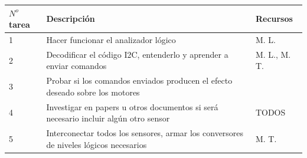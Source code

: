 \documentclass[spanish,12pt,a4paper,titlepage]{report}
\begin{document}
\begin{table}[H]
\begin{tabular}{|p{50pt}|p{250pt}|p{100pt}|} 
\hline
\cellcolor[gray]{0.8} $N^o$ \textbf{tarea} & \cellcolor[gray]{0.8} \textbf{Descripción} & \cellcolor[gray]{0.8} \textbf{Recursos} \\ \hline
1  & Hacer funcionar el analizador lógico & M. L.\\ \hline
2  & Decodificar el código I2C, entenderlo y aprender a enviar comandos & M. L., M. T.\\ \hline
3  & Probar si los comandos enviados producen el efecto deseado sobre los motores & \\ \hline
4  & Investigar en papers u otros documentos si será necesario incluir algún otro sensor & TODOS \\ \hline
5  & Interconectar todos los sensores, armar los conversores de niveles lógicos necesarios & M. T. \\ \hline
\end{tabular}
\end{table}
\end{document}
